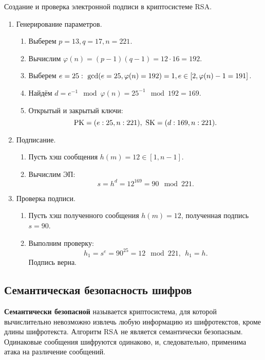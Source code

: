 \example Создание и проверка электронной подписи в криптосистеме RSA.

\begin{enumerate}
    \item Генерирование параметров.
        \begin{enumerate}
            \item Выберем $p=13, q=17, n = 221$.
            \item Вычислим $\varphi(n) = (p-1)(q-1) = 12 \cdot 16 = 192$.
            \item Выберем $e=25: ~ \gcd(e = 25, \varphi(n) = 192) = 1, \\
                e \in [2, \varphi(n) - 1 = 191]$.
            \item Найдём $d = e^{-1} \mod \varphi(n) = 25^{-1} \mod 192 = 169$.
            \item Открытый и закрытый ключи:
                \[ \textrm{PK} = (e:25, n:221), ~ \textrm{SK} = (d:169, n:221). \]
        \end{enumerate}
    \item Подписание.
        \begin{enumerate}
            \item Пусть хэш сообщения $h(m) = 12 \in [1, n-1]$.
            \item Вычислим ЭП:
                \[ s = h^d = 12^{169} = 90 \mod 221. \]
        \end{enumerate}
    \item Проверка подписи.
        \begin{enumerate}
            \item Пусть хэш полученного сообщения $h(m) = 12$, полученная подпись $s = 90$.
            \item Выполним проверку:
                \[ h_1 = s^e = 90^{25} = 12 \mod 221, ~~ h_1 = h. \]
                Подпись верна.
        \end{enumerate}
\end{enumerate}


\subsection{Семантическая безопасность шифров}

\textbf{Семантически безопасной} называется криптосистема, для которой вычислительно невозможно извлечь любую информацию из шифротекстов, кроме длины шифротекста. Алгоритм RSA не является семантически безопасным. Одинаковые сообщения шифруются одинаково, и, следовательно, применима атака на различение сообщений.

